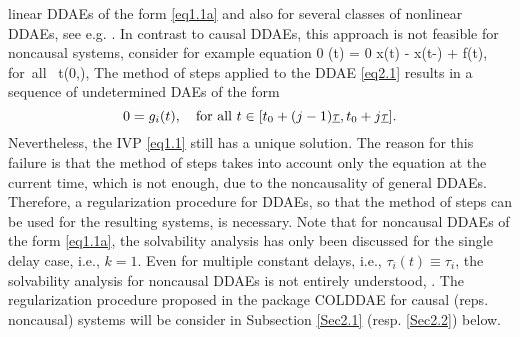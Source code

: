 \documentclass[final,reqno]{siamltex}
\begin{document}
linear DDAEs of the form \eqref{eq1.1a} and also for several classes of nonlinear DDAEs, see e.g. \cite{AscP95,BakPT02,GugH07,Hau97,ShaG06}.
In contrast to causal DDAEs, this approach is not feasible for noncausal systems,
consider for example equation 
%
\be\label{eq2.1}
  0 \cdot {}(t) = 0 \cdot x(t) - x(t-\tau) + f(t), \quad \mbox{for all } t\in (0,\infty),
\ee
%
The method of steps applied to the DDAE \eqref{eq2.1} results in a sequence of undetermined DAEs of the form
%
\[
 0 = g_i(t), \quad \mbox{for all } t \in [t_0+(j-1)\underline{\tau},t_0+j\underline{\tau}]. 
\]
%
Nevertheless, the IVP \eqref{eq1.1} still has a unique solution. 
The reason for this failure is that the method of steps takes into account only the equation at the current time, which is not enough, 
due to the noncausality of general DDAEs. Therefore, a regularization procedure for DDAEs, so that the method of steps can be used for the resulting systems, is 
necessary. Note that for noncausal DDAEs of the form \eqref{eq1.1a}, the solvability analysis has only been discussed for 
the single delay case, i.e., $k=1$. Even for multiple constant delays, i.e., $\tau_i(t) \equiv \tau_i$, the solvability analysis for noncausal DDAEs 
is not entirely understood, \cite{HaM14,Ha15}. 
The regularization procedure proposed in the package COLDDAE for causal (reps. noncausal) systems will be consider in Subsection \ref{Sec2.1} (resp. \ref{Sec2.2}) below.
\end{document}
